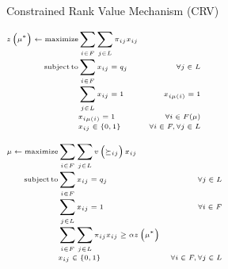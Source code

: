 \begin{algorithm}
    \caption{Constrained Rank Value Mechanism (CRV)}\label{alg:crv}
    \KwResult{\(\mu\)}
    \(\tiny
        \begin{aligned}
            z \left( \mu ^ { * } \right) \leftarrow \operatorname{maximize} & \sum_{i \in F} \sum_{j \in L} \pi_{i j} x_{i j} \\[-1mm]
            \operatorname {subject}\operatorname{to} & \sum_{i \in F} x_{i j}=q_{j} & \forall j \in L \\[-1mm]
            & \sum_{j \in L} x_{i j}=1 & x_{i \mu(i)}=1 \\[-1mm]
            & x_{i\mu (i)} = 1 &  \forall i \in F(\mu) \\[-1mm]
            & x_{i j} \in\{0,1\} & \forall i \in F, \forall j \in L
        \end{aligned}
    \)%

    \(\tiny
        \begin{aligned}
            \mu \leftarrow \operatorname{maximize} & \sum_{i \in F} \sum_{j \in L} v\left(\succeq_{i j}\right) x_{i j} \\[-1mm]
            \operatorname {subject}\operatorname{to} & \sum_{i \in F} x_{i j}=q_{j} & \forall j \in L \\[-1mm]
            & \sum_{j \in L} x_{i j}=1 & \forall i \in F \\[-1mm]
            & \sum_{i \in F} \sum_{j \in L} \pi_{i j} x_{i j} \geq \alpha z \left( \mu ^ { * } \right) \\[-1mm]
            & x_{i j} \in\{0,1\} & \forall i \in F, \forall j \in L
        \end{aligned}
    \)%

\end{algorithm}

